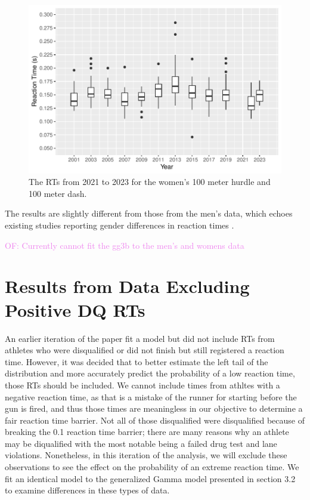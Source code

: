 \documentclass[12pt, letterpaper]{article}
\newcommand{\of}[1]{\textcolor{violet}{OF: #1}}
\begin{document}
\begin{figure}[tbp]
  \centering
  \includegraphics[width=\textwidth]{WomensBoxplot}
  \caption{The RTs from 2021 to 2023 for the women's 100 meter hurdle
  and 100 meter dash.}
  \label{fig:WomensBoxplot}
\end{figure}

The results are slightly different from those from the men's data,
which echoes existing studies reporting gender differences in reaction
times \citep[e.g.,][]{lipps2011implications, babicc2009reaction,
  panoutsakopoulos2020gender}.

\of{Currently cannot fit the gg3b to the men's and womens data}


\section{Results from Data Excluding Positive DQ RTs}

An earlier iteration of the paper fit a model but did not include RTs from
athletes who were disqualified or did not finish but still registered a reaction
time.  However, it was decided that to better estimate the left tail of the
distribution and more accurately predict the probability of a low reaction time,
those RTs should be included.  We cannot include times from athltes with a
negative reaction time, as that is a mistake of the runner for starting before
the gun is fired, and thus those times are meaningless in our objective to
determine a fair reaction time barrier.  Not all of those disqualified were
disqualified because of breaking the 0.1 reaction time barrier; there are many
reasons why an athlete may be diqualified with the most notable being a failed
drug test and lane violations.  Nonetheless, in this iteration of the analysis,
we will exclude these observations to see the effect on the probability of an
extreme reaction time.  We fit an identical model to the generalized Gamma model
presented in section 3.2 to examine differences in these types of data.
\end{document}

